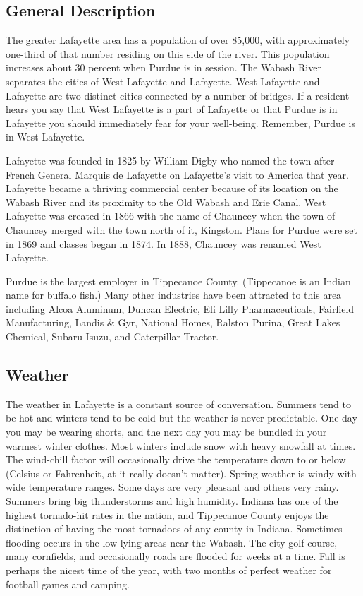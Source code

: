 
\subsection{General Description}
The greater Lafayette area has a population of over 85,000, with approximately one-third of that number residing on this side of the river. This population increases about 30 percent when Purdue is in session. The Wabash River separates the cities of West Lafayette and Lafayette. West Lafayette and Lafayette are two distinct cities connected by a number of bridges. If a resident hears you say that West Lafayette is a part of Lafayette or that Purdue is in Lafayette you should immediately fear for your well-being. Remember, Purdue is in West Lafayette.

Lafayette was founded in 1825 by William Digby who named the town after French General Marquis de Lafayette on Lafayette's visit to America that year. Lafayette became a thriving commercial center because of its location on the Wabash River and its proximity to the Old Wabash and Erie Canal. West Lafayette was created in 1866 with the name of Chauncey when the town of Chauncey merged with the town north of it, Kingston. Plans for Purdue were set in 1869 and classes began in 1874. In 1888, Chauncey was renamed West Lafayette.

Purdue is the largest employer in Tippecanoe County. (Tippecanoe is an Indian name for buffalo fish.) Many other industries have been attracted to this area including Alcoa Aluminum, Duncan Electric, Eli Lilly Pharmaceuticals, Fairfield Manufacturing, Landis \& Gyr, National Homes, Ralston Purina, Great Lakes Chemical, Subaru-Isuzu, and Caterpillar Tractor.




\subsection{Weather}
The weather in Lafayette is a constant source of conversation. Summers tend to be hot and winters tend to be cold but the weather is never predictable. One day you may be wearing shorts, and the next day you may be bundled in your warmest winter clothes. Most winters include snow with heavy snowfall at times. The wind-chill factor will occasionally drive the temperature down to or below (Celsius or Fahrenheit, at it really doesn't matter). Spring weather is windy with wide temperature ranges. Some days are very pleasant and others very rainy. Summers bring big thunderstorms and high humidity. Indiana has one of the highest tornado-hit rates in the nation, and Tippecanoe County enjoys the distinction of having the most tornadoes of any county in Indiana. Sometimes flooding occurs in the low-lying areas near the Wabash. The city golf course, many cornfields, and occasionally roads are flooded for weeks at a time. Fall is perhaps the nicest time of the year, with two months of perfect weather for football games and camping.

